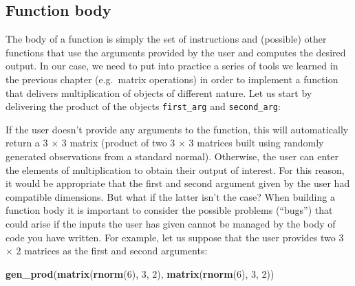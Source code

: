 \documentclass[12pt,]{krantz}
\newenvironment{Shaded}{\begin{snugshade}}{\end{snugshade}}
\newcommand{\KeywordTok}[1]{\textcolor[rgb]{0.27,0.27,0.27}{\textbf{#1}}}
\newcommand{\DataTypeTok}[1]{\textcolor[rgb]{0.27,0.27,0.27}{#1}}
\newcommand{\DecValTok}[1]{\textcolor[rgb]{0.06,0.06,0.06}{#1}}
\newcommand{\StringTok}[1]{\textcolor[rgb]{0.5,0.5,0.5}{#1}}
\newcommand{\ControlFlowTok}[1]{\textcolor[rgb]{0.27,0.27,0.27}{\textbf{#1}}}
\newcommand{\OperatorTok}[1]{\textcolor[rgb]{0.43,0.43,0.43}{\textbf{#1}}}
\newcommand{\NormalTok}[1]{#1}
\begin{document}
\subsection{Function body}\label{function-body}

The body of a function is simply the set of instructions and (possible)
other functions that use the arguments provided by the user and computes
the desired output. In our case, we need to put into practice a series
of tools we learned in the previous chapter (e.g.~matrix operations) in
order to implement a function that delivers multiplication of objects of
different nature. Let us start by delivering the product of the objects
\texttt{first\_arg} and \texttt{second\_arg}:

\begin{Shaded}
\end{Shaded}

If the user doesn't provide any arguments to the function, this will
automatically return a 3 \(\times\) 3 matrix (product of two 3
\(\times\) 3 matrices built using randomly generated observations from a
standard normal). Otherwise, the user can enter the elements of
multiplication to obtain their output of interest. For this reason, it
would be appropriate that the first and second argument given by the
user had compatible dimensions. But what if the latter isn't the case?
When building a function body it is important to consider the possible
problems (``bugs'') that could arise if the inputs the user has given
cannot be managed by the body of code you have written. For example, let
us suppose that the user provides two 3 \(\times\) 2 matrices as the
first and second arguments:

\begin{Shaded}
\begin{Highlighting}[]
\KeywordTok{gen_prod}\NormalTok{(}\KeywordTok{matrix}\NormalTok{(}\KeywordTok{rnorm}\NormalTok{(}\DecValTok{6}\NormalTok{), }\DecValTok{3}\NormalTok{, }\DecValTok{2}\NormalTok{), }\KeywordTok{matrix}\NormalTok{(}\KeywordTok{rnorm}\NormalTok{(}\DecValTok{6}\NormalTok{), }\DecValTok{3}\NormalTok{, }\DecValTok{2}\NormalTok{))}
\end{Highlighting}
\end{Shaded}
\end{document}
